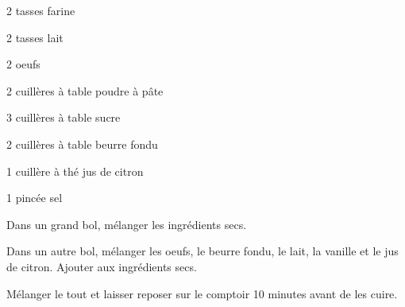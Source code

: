 


\totaltime{}


\begin{ingredients}
    \item 2 tasses farine
    \item 2 tasses lait
    \item 2 oeufs
    \item 2 cuillères à table poudre à pâte
    \item 3 cuillères à table sucre
    \item 2 cuillères à table beurre fondu
    \item 1 cuillère à thé jus de citron
    \item 1 pincée sel
\end{ingredients}

\begin{steps}
    \item Dans un grand bol, mélanger les ingrédients secs.
    \item Dans un autre bol, mélanger les oeufs, le beurre fondu, le lait, la vanille et le jus de citron. Ajouter aux ingrédients secs.
    \item Mélanger le tout et laisser reposer sur le comptoir 10 minutes avant de les cuire. 
\end{steps}
